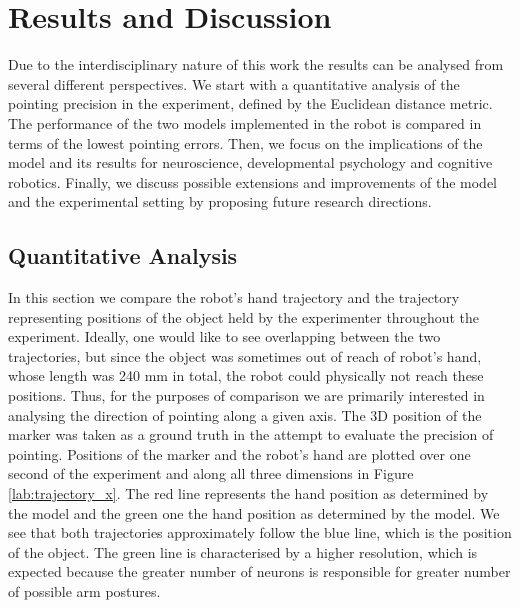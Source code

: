 \chapter{Results and Discussion}
\label{chap:discussion}


Due to the interdisciplinary nature of this work the results can be analysed from several different perspectives. We start with a quantitative analysis of the pointing precision in the experiment, defined by the Euclidean distance metric. The performance of the two models implemented in the robot is compared in terms of the lowest pointing errors. Then, we focus on the implications of the model and its results for neuroscience, developmental psychology and cognitive robotics. Finally, we discuss possible extensions and improvements of the model and the experimental setting by proposing future research directions.



\section{Quantitative Analysis}

In this section we compare the robot's hand trajectory and the trajectory representing positions of the object held by the experimenter throughout the experiment. 
Ideally, one would like to see overlapping between the two trajectories, but since the object was sometimes out of reach of robot's hand, whose length was 240 mm in total, the robot could physically not reach these positions. Thus, for the purposes of comparison we are primarily interested in analysing the direction of pointing along a given axis.
The 3D position of the marker was taken as a ground truth in the attempt to evaluate the precision of pointing. 
Positions of the marker and the robot's hand are plotted over one second of the experiment and along all three dimensions in Figure \ref{lab:trajectory_x}.
The red line represents the hand position as determined by the \ssom model and the green one the hand position as determined by the \bsom model. We see that both trajectories approximately follow the blue line, which is the position of the object.
The green line is characterised by a higher resolution, which is expected because the greater number of neurons is responsible for greater number of possible arm postures.

